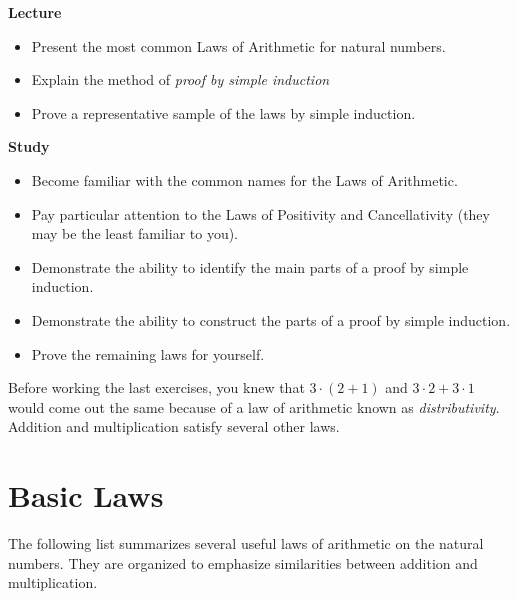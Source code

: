 \begin{goals}
\noindent\textbf{Lecture}
\begin{itemize}
\item Present the most common Laws of Arithmetic for natural numbers.
\item Explain the method of \emph{proof by simple induction}
\item Prove a representative sample of the laws by simple induction.
\end{itemize}
\noindent\textbf{Study}
\begin{itemize}
\item Become familiar with the common names for the Laws of Arithmetic.
\item Pay particular attention to the Laws of Positivity and Cancellativity (they may be the least familiar to you).
\item Demonstrate the ability to identify the main parts of a proof by simple induction.
\item Demonstrate the ability to construct the parts of a proof by simple induction.
\item Prove the remaining laws for yourself.
\end{itemize}
\end{goals}

Before working the last exercises, you knew that $3\cdot (2+1)$ and $3\cdot 2+ 3\cdot 1$
would come out the same because of a law of arithmetic known as \emph{distributivity}. 
Addition and multiplication satisfy several other laws.

\ipadbreak

\section{Basic Laws}

The following list summarizes several useful laws of
arithmetic on the natural numbers. They are organized to emphasize
similarities between addition and multiplication.

